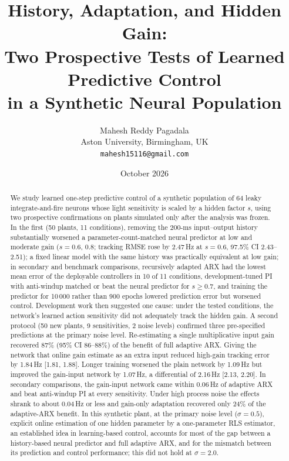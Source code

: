 \documentclass[11pt]{article}
\title{History, Adaptation, and Hidden Gain:\\ Two Prospective Tests of Learned Predictive Control\\ in a Synthetic Neural Population}
\author{Mahesh Reddy Pagadala\\ \small Aston University, Birmingham, UK\\ \small \texttt{mahesh15116@gmail.com}}
\date{October 2026}
\newcommand{\Hz}{\,Hz}
\begin{document}
\maketitle

\begin{abstract}
We study learned one-step predictive control of a synthetic population of 64 leaky integrate-and-fire neurons whose light sensitivity is scaled by a hidden factor $s$, using two prospective confirmations on plants simulated only after the analysis was frozen. In the first (50 plants, 11 conditions), removing the 200-ms input--output history substantially worsened a parameter-count-matched neural predictor at low and moderate gain ($s=0.6$, $0.8$; tracking RMSE rose by 2.47\Hz{} at $s=0.6$, 97.5\% CI 2.43--2.51); a fixed linear model with the same history was practically equivalent at low gain; in secondary and benchmark comparisons, recursively adapted ARX had the lowest mean error of the deployable controllers in 10 of 11 conditions, development-tuned PI with anti-windup matched or beat the neural predictor for $s\ge0.7$, and training the predictor for 10\,000 rather than 900 epochs lowered prediction error but worsened control. Development work then suggested one cause: under the tested conditions, the network's learned action sensitivity did not adequately track the hidden gain. A second protocol (50 new plants, 9 sensitivities, 2 noise levels) confirmed three pre-specified predictions at the primary noise level. Re-estimating a single multiplicative input gain recovered 87\% (95\% CI 86--88\%) of the benefit of full adaptive ARX. Giving the network that online gain estimate as an extra input reduced high-gain tracking error by 1.84\Hz{} [1.81, 1.88]. Longer training worsened the plain network by 1.09\Hz{} but improved the gain-input network by 1.07\Hz{}, a differential of 2.16\Hz{} [2.13, 2.20]. In secondary comparisons, the gain-input network came within 0.06\Hz{} of adaptive ARX and beat anti-windup PI at every sensitivity. Under high process noise the effects shrank to about 0.04\Hz{} or less and gain-only adaptation recovered only 24\% of the adaptive-ARX benefit. In this synthetic plant, at the primary noise level ($\sigma=0.5$), explicit online estimation of one hidden parameter by a one-parameter RLS estimator, an established idea in learning-based control, accounts for most of the gap between a history-based neural predictor and full adaptive ARX, and for the mismatch between its prediction and control performance; this did not hold at $\sigma=2.0$.
\end{abstract}
\end{document}
